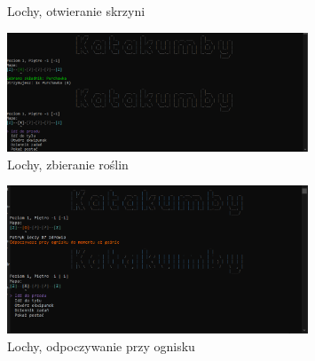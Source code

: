 \begin{itemize}
\begin{figure}[H]
                \caption{Lochy, otwieranie skrzyni}
                \label{fig:dungeons_5}
            \end{figure}
            \begin{figure}[H]
                \centering
                \includegraphics[width=0.8\textwidth]{figures/warstwa_uzytkowa/lochy_6.png}
                \caption{Lochy, zbieranie roślin}
                \label{fig:dungeons_6}
            \end{figure}
            \begin{figure}[H]
                \centering
                \includegraphics[width=0.8\textwidth]{figures/warstwa_uzytkowa/lochy_7.png}
                \caption{Lochy, odpoczywanie przy ognisku}
                \label{fig:dungeons_7}
            \end{figure}
\end{itemize}
